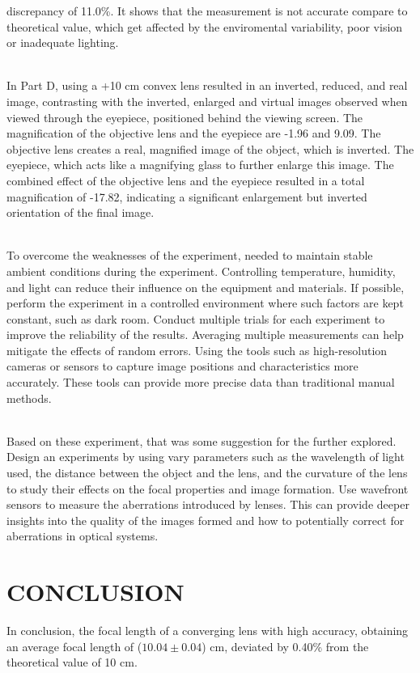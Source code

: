 \documentclass[a4paper,11pt]{article}
\begin{document}
discrepancy of 11.0\%. It shows that the measurement is not accurate compare to theoretical value, which get affected by the enviromental variability, poor vision or inadequate lighting.\\
\\
\par In Part D, using a +10 cm convex lens resulted in an inverted, reduced, and real image, contrasting with the inverted, enlarged and virtual images observed when viewed through the eyepiece, positioned behind the viewing screen. The magnification of the objective lens and the eyepiece are -1.96 and 9.09.  The objective lens creates a real, magnified image of the object, which is inverted. The eyepiece, which acts like a magnifying glass to further enlarge this image. The combined effect of the objective lens and the eyepiece resulted in a total magnification of -17.82, indicating a significant enlargement but inverted orientation of the final image.\\
\\
\par To overcome the weaknesses of the experiment, needed to maintain stable ambient conditions during the experiment. Controlling temperature, humidity, and light can reduce their influence on the equipment and materials. If possible, perform the experiment in a controlled environment where such factors are kept constant, such as dark room. Conduct multiple trials for each experiment to improve the reliability of the results. Averaging multiple measurements can help mitigate the effects of random errors. Using the tools such as high-resolution cameras or sensors to capture image positions and characteristics more accurately. These tools can provide more precise data than traditional manual methods.\\
\\
\par Based on these experiment, that was some suggestion for the further explored. Design an experiments by using vary parameters such as the wavelength of light used, the distance between the object and the lens, and the curvature of the lens to study their effects on the focal properties and image formation. Use wavefront sensors to measure the aberrations introduced by lenses. This can provide deeper insights into the quality of the images formed and how to potentially correct for aberrations in optical systems.
\newpage
{}
\section*{\center  CONCLUSION}
\label{sec:CONCLUSION}
\qquad In conclusion, the focal length of a converging lens with high accuracy, obtaining an average focal length of (\(10.04 \pm 0.04\)) cm, deviated by 0.40\% from the theoretical value of 10 cm.\\
\end{document}
